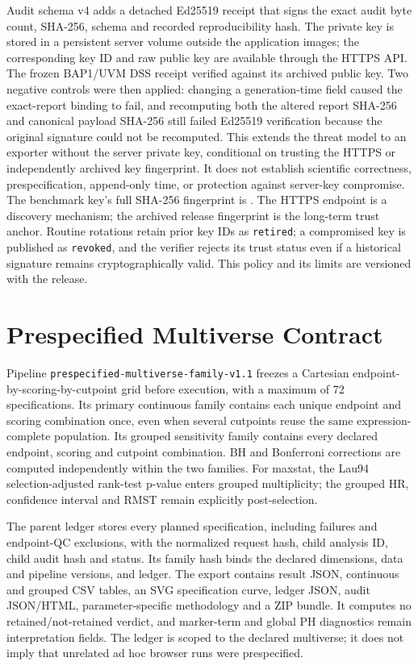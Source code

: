 \documentclass[12pt]{article}
\begin{document}
Audit schema v4 adds a detached Ed25519 receipt that signs the exact audit byte
count, SHA-256, schema and recorded reproducibility hash. The private key is
stored in a persistent server volume outside the application images; the
corresponding key ID and raw public key are available through the HTTPS API.
The frozen BAP1/UVM DSS receipt verified against its archived public key. Two
negative controls were then applied: changing a generation-time field caused
the exact-report binding to fail, and recomputing both the altered report
SHA-256 and canonical payload SHA-256 still failed Ed25519 verification because
the original signature could not be recomputed. This extends the threat model
to an exporter without the server private key, conditional on trusting the
HTTPS or independently archived key fingerprint. It does not establish
scientific correctness, prespecification, append-only time, or protection
against server-key compromise.
The benchmark key's full SHA-256 fingerprint is
.
The HTTPS endpoint is a discovery mechanism; the archived release fingerprint
is the long-term trust anchor. Routine rotations retain prior key IDs as
\texttt{retired}; a compromised key is published as \texttt{revoked}, and the
verifier rejects its trust status even if a historical signature remains
cryptographically valid. This policy and its limits are versioned with the
release.



\section*{Prespecified Multiverse Contract}

Pipeline \texttt{prespecified-multiverse-family-v1.1} freezes a Cartesian
endpoint-by-scoring-by-cutpoint grid before execution, with a maximum of 72
specifications. Its primary continuous family contains each unique endpoint
and scoring combination once, even when several cutpoints reuse the same
expression-complete population. Its grouped sensitivity family contains every
declared endpoint, scoring and cutpoint combination. BH and Bonferroni
corrections are computed independently within the two families. For maxstat,
the Lau94 selection-adjusted rank-test p-value enters grouped multiplicity;
the grouped HR, confidence interval and RMST remain explicitly
post-selection.

The parent ledger stores every planned specification, including failures and
endpoint-QC exclusions, with the normalized request hash, child analysis ID,
child audit hash and status. Its family hash binds the declared dimensions,
data and pipeline versions, and ledger. The export contains result JSON,
continuous and grouped CSV tables, an SVG specification curve, ledger JSON,
audit JSON/HTML, parameter-specific methodology and a ZIP bundle. It computes
no retained/not-retained verdict, and marker-term and global PH diagnostics
remain interpretation fields. The ledger is scoped to the declared
multiverse; it does not imply that unrelated ad hoc browser runs were
prespecified.
\end{document}
